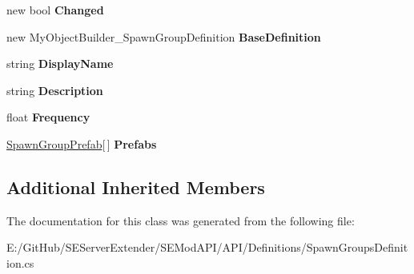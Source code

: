 \begin{DoxyCompactItemize}
\item 
\hypertarget{class_s_e_mod_a_p_i_1_1_a_p_i_1_1_definitions_1_1_spawn_group_definition_a4fcc6edb4daa1d0efbe2b7945a41f039}{}new bool {\bfseries Changed}\label{class_s_e_mod_a_p_i_1_1_a_p_i_1_1_definitions_1_1_spawn_group_definition_a4fcc6edb4daa1d0efbe2b7945a41f039}

\item 
\hypertarget{class_s_e_mod_a_p_i_1_1_a_p_i_1_1_definitions_1_1_spawn_group_definition_a44f2ee2f94b7d964ff8553fad4546c40}{}new My\+Object\+Builder\+\_\+\+Spawn\+Group\+Definition {\bfseries Base\+Definition}\label{class_s_e_mod_a_p_i_1_1_a_p_i_1_1_definitions_1_1_spawn_group_definition_a44f2ee2f94b7d964ff8553fad4546c40}

\item 
\hypertarget{class_s_e_mod_a_p_i_1_1_a_p_i_1_1_definitions_1_1_spawn_group_definition_aafc29417c378c49211f338c684428849}{}string {\bfseries Display\+Name}\label{class_s_e_mod_a_p_i_1_1_a_p_i_1_1_definitions_1_1_spawn_group_definition_aafc29417c378c49211f338c684428849}

\item 
\hypertarget{class_s_e_mod_a_p_i_1_1_a_p_i_1_1_definitions_1_1_spawn_group_definition_a7130fb1817bb7df92016747a611f50d7}{}string {\bfseries Description}\label{class_s_e_mod_a_p_i_1_1_a_p_i_1_1_definitions_1_1_spawn_group_definition_a7130fb1817bb7df92016747a611f50d7}

\item 
\hypertarget{class_s_e_mod_a_p_i_1_1_a_p_i_1_1_definitions_1_1_spawn_group_definition_aa253ba4b3dfe0f243ed48d72e0fafaa0}{}float {\bfseries Frequency}\label{class_s_e_mod_a_p_i_1_1_a_p_i_1_1_definitions_1_1_spawn_group_definition_aa253ba4b3dfe0f243ed48d72e0fafaa0}

\item 
\hypertarget{class_s_e_mod_a_p_i_1_1_a_p_i_1_1_definitions_1_1_spawn_group_definition_a685ef85398cda96981d768b2c667b907}{}\hyperlink{class_s_e_mod_a_p_i_1_1_a_p_i_1_1_definitions_1_1_spawn_group_prefab}{Spawn\+Group\+Prefab}\mbox{[}$\,$\mbox{]} {\bfseries Prefabs}\label{class_s_e_mod_a_p_i_1_1_a_p_i_1_1_definitions_1_1_spawn_group_definition_a685ef85398cda96981d768b2c667b907}

\end{DoxyCompactItemize}
\subsection*{Additional Inherited Members}


The documentation for this class was generated from the following file\+:\begin{DoxyCompactItemize}
\item 
E\+:/\+Git\+Hub/\+S\+E\+Server\+Extender/\+S\+E\+Mod\+A\+P\+I/\+A\+P\+I/\+Definitions/Spawn\+Groups\+Definition.\+cs\end{DoxyCompactItemize}
